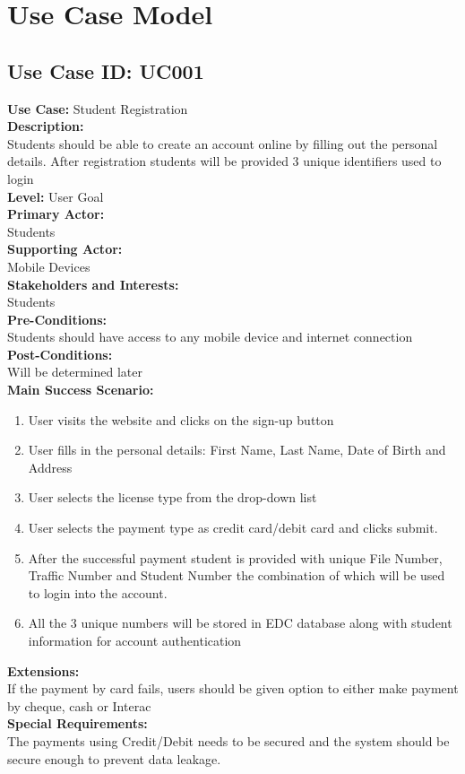 \documentclass{report}
\begin{document}
\section{Use Case Model}
\subsection{\textbf{Use Case ID:} UC001}
\textbf{Use Case:} Student Registration\\[0.3cm]
\textbf{Description:}\\
Students should be able to create an account online by filling out the personal details. After registration students will be provided 3 unique identifiers used to login\\[0.3cm]
\textbf{Level:} User Goal\\[0.3cm]
\textbf{Primary Actor:}\\
Students\\[0.3cm]
\textbf{Supporting Actor:}\\
Mobile Devices\\[0.3cm]
\textbf{Stakeholders and Interests:}\\
Students\\[0.3cm]
\textbf{Pre-Conditions:}\\
Students should have access to any mobile device and internet connection\\[0.3cm]
\textbf{Post-Conditions:}\\
Will be determined later\\[0.3cm]
\textbf{\large {Main Success Scenario:}}
\begin{enumerate}
    \item User visits the website and clicks on the sign-up button
    \item User fills in the personal details: First Name, Last Name, Date of Birth and Address
    \item User selects the license type from the drop-down list
    \item User selects the payment type as credit card/debit card and clicks submit.
    \item After the successful payment student is provided with unique File Number, Traffic Number and Student Number the combination of which will be used to login into the account.
    \item All the 3 unique numbers will be stored in EDC database along with student information for account authentication
\end{enumerate}
\textbf{Extensions:}\\
If the payment by card fails, users should be given option to either make payment by cheque, cash or Interac\\[0.3cm]
\textbf{Special Requirements:}\\
The payments using Credit/Debit needs to be secured and the system should be secure enough to prevent data leakage.\\
\end{document}
